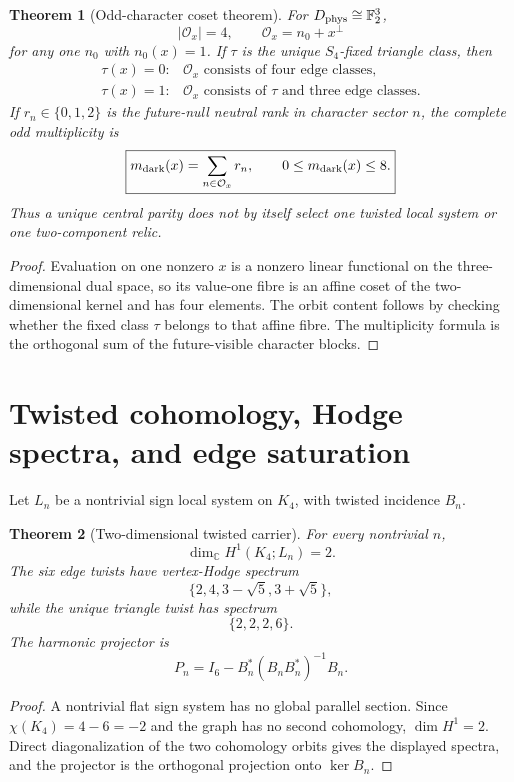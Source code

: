 \documentclass[11pt,oneside,openany]{book}
\numberwithin{equation}{chapter}
\newtheorem{theorem}{Theorem}[chapter]
\theoremstyle{definition}
\theoremstyle{remark}
\newcommand{\C}{\mathbb C}
\newcommand{\Ftwo}{\mathbb F_2}
\begin{document}
\begin{theorem}[Odd-character coset theorem]
\label{thm:v5-odd-character-coset}
For \(D_{\rm phys}\cong\Ftwo^3\),
\[
 \boxed{|\mathcal O_x|=4,\qquad \mathcal O_x=n_0+x^\perp}
\]
for any one \(n_0\) with \(n_0(x)=1\).  If \(\tau\) is the unique
\(S_4\)-fixed triangle class, then
\[
 \boxed{
 \begin{array}{ll}
 \tau(x)=0:&\mathcal O_x\text{ consists of four edge classes},\\[1mm]
 \tau(x)=1:&\mathcal O_x\text{ consists of }\tau\text{ and three edge classes}.
 \end{array}}
\]
If \(r_n\in\{0,1,2\}\) is the future-null neutral rank in character sector
\(n\), the complete odd multiplicity is
\[
 \boxed{m_{\rm dark}(x)=\sum_{n\in\mathcal O_x}r_n,
 \qquad 0\le m_{\rm dark}(x)\le8.}
\]
Thus a unique central parity does not by itself select one twisted local system
or one two-component relic.
\end{theorem}

\begin{proof}
Evaluation on one nonzero \(x\) is a nonzero linear functional on the
three-dimensional dual space, so its value-one fibre is an affine coset of the
two-dimensional kernel and has four elements.  The orbit content follows by
checking whether the fixed class \(\tau\) belongs to that affine fibre.  The
multiplicity formula is the orthogonal sum of the future-visible character
blocks.
\end{proof}

\section{Twisted cohomology, Hodge spectra, and edge saturation}
Let \(L_n\) be a nontrivial sign local system on \(K_4\), with twisted
incidence \(B_n\).

\begin{theorem}[Two-dimensional twisted carrier]
\label{thm:twisted-carrier}
For every nontrivial \(n\),
\[
 \boxed{\dim_\C H^1(K_4;L_n)=2.}
\]
The six edge twists have vertex-Hodge spectrum
\[
 \{2,4,3-\sqrt5,3+\sqrt5\},
\]
while the unique triangle twist has spectrum
\[
 \{2,2,2,6\}.
\]
The harmonic projector is
\[
 \boxed{P_n=I_6-B_n^*(B_nB_n^*)^{-1}B_n.}
\]
\end{theorem}

\begin{proof}
A nontrivial flat sign system has no global parallel section.  Since
\(\chi(K_4)=4-6=-2\) and the graph has no second cohomology,
\(\dim H^1=2\).  Direct diagonalization of the two cohomology orbits gives the
displayed spectra, and the projector is the orthogonal projection onto
\(\ker B_n\).
\end{proof}
\end{document}
